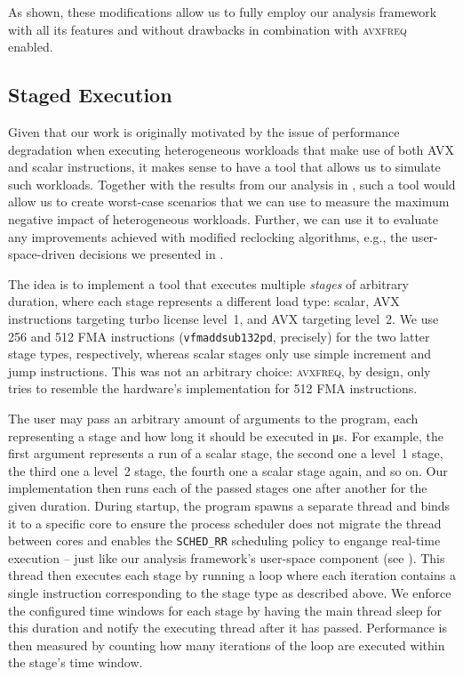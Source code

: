 As shown, these modifications allow us to fully employ our analysis framework with all its features and without drawbacks in combination with \textsc{avxfreq} enabled.

\subsection{Staged Execution}
\label{sec:evaluation:design:stagedexecution}

Given that our work is originally motivated by the issue of performance degradation when executing heterogeneous workloads that make use of both \gls{AVX} and scalar instructions, it makes sense to have a tool that allows us to simulate such workloads. Together with the results from our analysis in , such a tool would allow us to create worst-case scenarios that we can use to measure the maximum negative impact of heterogeneous workloads. Further, we can use it to evaluate any improvements achieved with modified reclocking algorithms, e.g., the user-space-driven decisions we presented in .

The idea is to implement a tool that executes multiple \emph{stages} of arbitrary duration, where each stage represents a different load type: scalar, \gls{AVX} instructions targeting turbo license level~1, and \gls{AVX} targeting level~2. We use \SI{256}{\bit} and \SI{512}{\bit} \gls{FMA} instructions (\texttt{vfmaddsub132pd}, precisely) for the two latter stage types, respectively, whereas scalar stages only use simple increment and jump instructions. This was not an arbitrary choice: \textsc{avxfreq}, by design, only tries to resemble the hardware's implementation for \SI{512}{\bit} \gls{FMA} instructions.

The user may pass an arbitrary amount of arguments to the program, each representing a stage and how long it should be executed in \si{\micro\second}. For example, the first argument represents a run of a scalar stage, the second one a level~1 stage, the third one a level~2 stage, the fourth one a scalar stage again, and so on. Our implementation then runs each of the passed stages one after another for the given duration. During startup, the program spawns a separate thread and binds it to a specific core to ensure the process scheduler does not migrate the thread between cores and enables the \texttt{SCHED\_RR} scheduling policy to engange real-time execution -- just like our analysis framework's user-space component (see ). This thread then executes each stage by running a loop where each iteration contains a single instruction corresponding to the stage type as described above. We enforce the configured time windows for each stage by having the main thread sleep for this duration and notify the executing thread after it has passed. Performance is then measured by counting how many iterations of the loop are executed within the stage's time window.

